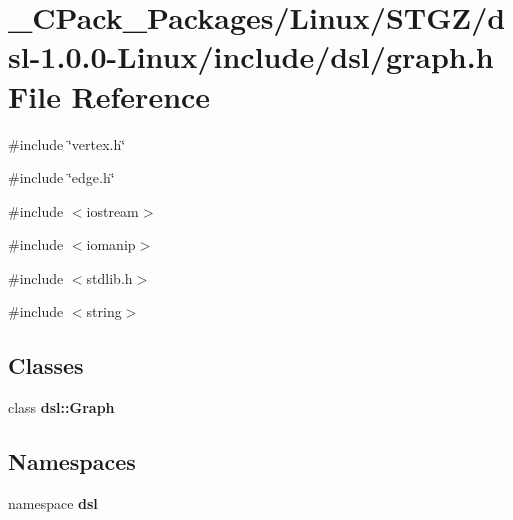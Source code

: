 \section{\_\-CPack\_\-Packages/Linux/STGZ/dsl-\/1.0.0-\/Linux/include/dsl/graph.h File Reference}
\label{__CPack__Packages_2Linux_2STGZ_2dsl-1_80_80-Linux_2include_2dsl_2graph_8h}
{\ttfamily \#include \char`\"{}vertex.h\char`\"{}}\par
{\ttfamily \#include \char`\"{}edge.h\char`\"{}}\par
{\ttfamily \#include $<$iostream$>$}\par
{\ttfamily \#include $<$iomanip$>$}\par
{\ttfamily \#include $<$stdlib.h$>$}\par
{\ttfamily \#include $<$string$>$}\par
\subsection*{Classes}
\begin{DoxyCompactItemize}
\item 
class {\bf dsl::Graph}
\end{DoxyCompactItemize}
\subsection*{Namespaces}
\begin{DoxyCompactItemize}
\item 
namespace {\bf dsl}
\end{DoxyCompactItemize}
